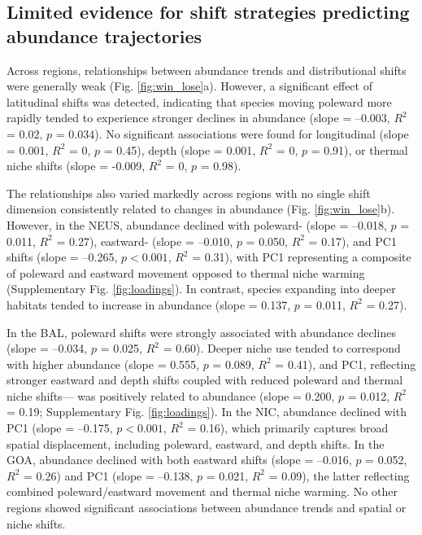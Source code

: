 \documentclass[11pt]{article}
\begin{document}
\begin{spacing}{1.5}
\subsection{Limited evidence for shift strategies predicting abundance trajectories}

Across regions, relationships between abundance trends and distributional shifts were generally weak (Fig. \ref{fig:win_lose}a). However, a significant effect of latitudinal shifts was detected, indicating that species moving poleward more rapidly tended to experience stronger declines in abundance (slope = –0.003, $R^2$ = 0.02, $p$ = 0.034). No significant associations were found for longitudinal (slope = 0.001, $R^2$ = 0, $p$ = 0.45), depth (slope = 0.001, $R^2$ = 0, $p$ = 0.91), or thermal niche shifts (slope = -0.009, $R^2$ = 0, $p$ = 0.98).

The relationships also varied markedly across regions with no single shift dimension consistently related to changes in abundance (Fig. \ref{fig:win_lose}b). However, in the NEUS, abundance declined with poleward- (slope = –0.018, $p$ = 0.011, $R^2$ = 0.27), eastward- (slope = –0.010, $p$ = 0.050, $R^2$ = 0.17), and PC1 shifts (slope = –0.265, $p < 0.001$, $R^2$ = 0.31), with PC1 representing a composite of poleward and eastward movement opposed to thermal niche warming (Supplementary Fig. \ref{fig:loadings}). In contrast, species expanding into deeper habitats tended to increase in abundance (slope = 0.137, $p$ = 0.011, $R^2$ = 0.27).

In the BAL, poleward shifts were strongly associated with abundance declines (slope = –0.034, $p$ = 0.025, $R^2$ = 0.60). Deeper niche use tended to correspond with higher abundance (slope = 0.555, $p$ = 0.089, $R^2$ = 0.41), and PC1, reflecting stronger eastward and depth shifts coupled with reduced poleward and thermal niche shifts— was positively related to abundance (slope = 0.200, $p$ = 0.012, $R^2$ = 0.19; Supplementary Fig. \ref{fig:loadings}). In the NIC, abundance declined with PC1 (slope = –0.175, $p < 0.001$, $R^2$ = 0.16), which primarily captures broad spatial displacement, including poleward, eastward, and depth shifts. In the GOA, abundance declined with both eastward shifts (slope = –0.016, $p$ = 0.052, $R^2$ = 0.26) and PC1 (slope = –0.138, $p$ = 0.021, $R^2$ = 0.09), the latter reflecting combined poleward/eastward movement and thermal niche warming. No other regions showed significant associations between abundance trends and spatial or niche shifts.



\end{spacing}
\end{document}
